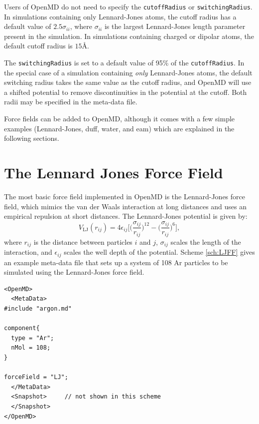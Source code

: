 \documentclass[]{book}
\begin{document}
Users of {\sc OpenMD} do not need to specify the {\tt cutoffRadius} or
{\tt switchingRadius}.  In simulations containing only Lennard-Jones
atoms, the cutoff radius has a default value of $2.5\sigma_{ii}$,
where $\sigma_{ii}$ is the largest Lennard-Jones length parameter
present in the simulation.  In simulations containing charged or
dipolar atoms, the default cutoff radius is $15 \mbox{\AA}$.  

The {\tt switchingRadius} is set to a default value of 95\% of the
{\tt cutoffRadius}.  In the special case of a simulation containing
{\it only} Lennard-Jones atoms, the default switching radius takes the
same value as the cutoff radius, and {\sc OpenMD} will use a shifted
potential to remove discontinuities in the potential at the cutoff.
Both radii may be specified in the meta-data file.

Force fields can be added to {\sc OpenMD}, although it comes with a few
simple examples (Lennard-Jones, {\sc duff}, {\sc water}, and {\sc
eam}) which are explained in the following sections.

\section{\label{sec:LJPot}The Lennard Jones Force Field}

The most basic force field implemented in {\sc OpenMD} is the
Lennard-Jones force field, which mimics the van der Waals interaction
at long distances and uses an empirical repulsion at short
distances. The Lennard-Jones potential is given by:
\begin{equation}
V_{\text{LJ}}(r_{ij}) = 
	4\epsilon_{ij} \biggl[
	\biggl(\frac{\sigma_{ij}}{r_{ij}}\biggr)^{12}
	- \biggl(\frac{\sigma_{ij}}{r_{ij}}\biggr)^{6}
	\biggr],
\label{eq:lennardJonesPot}
\end{equation}
where $r_{ij}$ is the distance between particles $i$ and $j$,
$\sigma_{ij}$ scales the length of the interaction, and
$\epsilon_{ij}$ scales the well depth of the potential. Scheme
\ref{sch:LJFF} gives an example meta-data file that
sets up a system of 108 Ar particles to be simulated using the
Lennard-Jones force field.

\begin{lstlisting}[float,caption={[Invocation of the Lennard-Jones
force field] A sample startup file for a small Lennard-Jones
simulation.},label={sch:LJFF}]
<OpenMD>
  <MetaData>
#include "argon.md" 

component{
  type = "Ar";
  nMol = 108;
}

forceField = "LJ";
  </MetaData>
  <Snapshot>     // not shown in this scheme
  </Snapshot>
</OpenMD>
\end{lstlisting}
\end{document}
